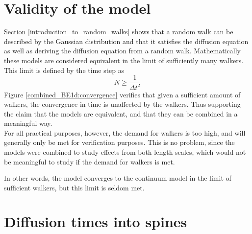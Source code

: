 \documentclass[main.tex]{subfiles}
\begin{document}
 

\section{Validity of the model}\label{results:validity_of_the_model}

Section \ref{introduction_to_random_walks} shows that a random walk can be described by the Gaussian distribution and that it satisfies the diffusion equation as well as deriving the diffusion equation from a random walk. 
Mathematically these models are considered equivalent in the limit of sufficiently many walkers. 
This limit is defined by the time step as 
\begin{equation}
 N \geq \frac{1}{\Delta t^2}
\end{equation}
Figure \ref{combined_BE1d:convergence} verifies that given a sufficient amount of walkers, the convergence in time is unaffected by the walkers. 
Thus supporting the claim that the models are equivalent, and that they can be combined in a meaningful way. \\

For all practical purposes, however, the demand for walkers is too high, and will generally only be met for verification purposes. 
This is no problem, since the models were combined to study effects from both length scales, which would not be meaningful to study if the demand for walkers is met. 

In other words, the model converges to the continuum model in the limit of sufficient walkers, but this limit is seldom met.


\section{Diffusion times into spines}
\end{document}
